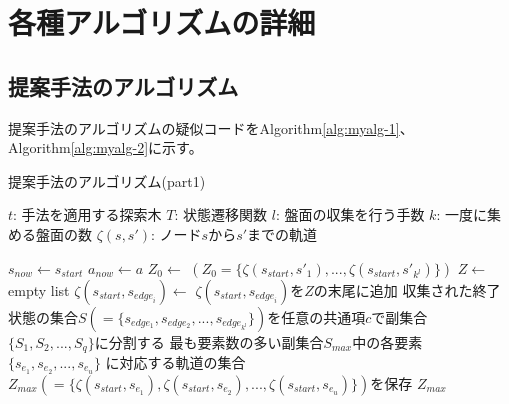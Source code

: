 \chapter{各種アルゴリズムの詳細}
\label{chap:alg}
\section{提案手法のアルゴリズム}
提案手法のアルゴリズムの疑似コードをAlgorithm\ref{alg:myalg-1}、Algorithm\ref{alg:myalg-2}に示す。
\begin{algorithm}
    
    \caption{提案手法のアルゴリズム(part1)}
    \label{alg:myalg-1}
    \begin{algorithmic}[1]
        \State $t$: 手法を適用する探索木
        \State $T$: 状態遷移関数
        \State $l$: 盤面の収集を行う手数
        \State $k$: 一度に集める盤面の数
        \State $\zeta(s, s')$: ノード$s$から$s'$までの軌道
        
       
           \State $s_{now}\gets s_{start}$
           \State $a_{now}\gets a$
           \State $Z_0 \gets$
           \State $(Z_0 =\{\zeta(s_{start}, {s'}_1), ..., \zeta(s_{start}, {s'}_{k^l})\})$
           \State $ Z \gets$ empty list
             \State $\zeta(s_{start}, s_{{edge}_i}) \gets$ 
             \State $\zeta(s_{start}, s_{{edge}_i})$を$Z$の末尾に追加
           \EndFor
           \State 収集された終了状態の集合$S(=\{s_{edge_1},s_{edge_2}, ..., s_{edge_{k^l}}\})$を任意の共通項$c$で副集合$\{S_1, S_2, ..., S_q\}$に分割する
           \State 最も要素数の多い副集合$S_{max}$中の各要素$\{s_{e_1}, s_{e_2}, ...,  s_{e_u}\}$
           \State に対応する軌道の集合$Z_{max}(=\{\zeta(s_{start}, s_{e_1}), \zeta(s_{start}, s_{e_2}), ..., \zeta(s_{start}, s_{e_u})\})$を保存
           \State \Return $Z_{max}$
        \EndFunction
    \end{algorithmic}
\end{algorithm}
